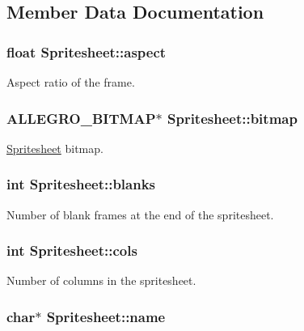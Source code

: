 \subsection{Member Data Documentation}
\hypertarget{structSpritesheet_a85c93c8d80227725374e1581c4c8e049}{
\subsubsection[{aspect}]{\setlength{\rightskip}{0pt plus 5cm}float Spritesheet\-::aspect}}\label{structSpritesheet_a85c93c8d80227725374e1581c4c8e049}
Aspect ratio of the frame. \hypertarget{structSpritesheet_ad31be6e59349586862e6a813ea139bcb}{
\subsubsection[{bitmap}]{\setlength{\rightskip}{0pt plus 5cm}A\-L\-L\-E\-G\-R\-O\-\_\-\-B\-I\-T\-M\-A\-P$\ast$ Spritesheet\-::bitmap}}\label{structSpritesheet_ad31be6e59349586862e6a813ea139bcb}
\hyperlink{structSpritesheet}{Spritesheet} bitmap. \hypertarget{structSpritesheet_a5010b18959949b1c577078f94a810ef3}{
\subsubsection[{blanks}]{\setlength{\rightskip}{0pt plus 5cm}int Spritesheet\-::blanks}}\label{structSpritesheet_a5010b18959949b1c577078f94a810ef3}
Number of blank frames at the end of the spritesheet. \hypertarget{structSpritesheet_a3d512755ce492a35e1816fe026cc37c9}{
\subsubsection[{cols}]{\setlength{\rightskip}{0pt plus 5cm}int Spritesheet\-::cols}}\label{structSpritesheet_a3d512755ce492a35e1816fe026cc37c9}
Number of columns in the spritesheet. \hypertarget{structSpritesheet_a6788d53f825bd74cda7e50e75435befa}{
\subsubsection[{name}]{\setlength{\rightskip}{0pt plus 5cm}char$\ast$ Spritesheet\-::name}}\label{structSpritesheet_a6788d53f825bd74cda7e50e75435befa}
